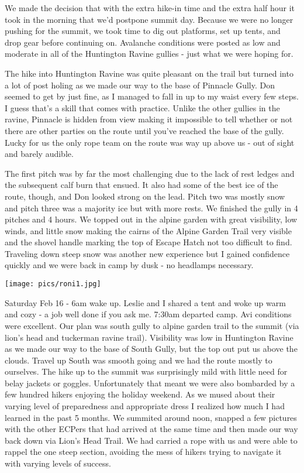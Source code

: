 \documentclass[10pt,a4paper]{article}
\newenvironment{Figure}
  {\par\medskip\noindent\minipage{\linewidth}}
  {\endminipage\par\medskip}
\begin{document}
\begin{multicols}{2}
We made the decision that with the extra hike-in time and the extra half hour it took in the morning that we'd postpone summit day. Because we were no longer pushing for the summit, we took time to dig out platforms, set up tents, and drop gear before continuing on. Avalanche conditions were posted as low and moderate in all of the Huntington Ravine gullies - just what we were hoping for. 


The hike into Huntington Ravine was quite pleasant on the trail but turned into a lot of post holing as we made our way to the base of Pinnacle Gully. Don seemed to get by just fine, as I managed to fall in up to my waist every few steps. I guess that's a skill that comes with practice. 
Unlike the other gullies in the ravine, Pinnacle is hidden from view making it impossible to tell whether or not there are other parties on the route until you've reached the base of the gully. Lucky for us the only rope team on the route was way up above us - out of sight and barely audible.


 The first pitch was by far the most challenging due to the lack of rest ledges and the subsequent calf burn that ensued. It also had some of the best ice of the route, though, and Don looked strong on the lead. Pitch two was mostly snow and pitch three was a majority ice but with more rests. We finished the gully in 4 pitches and 4 hours. We topped out in the alpine garden with great visibility, low winds, and little snow making the cairns of the Alpine Garden Trail very visible and the shovel handle marking the top of Escape Hatch not too difficult to find. 
Traveling down steep snow was another new experience but I gained confidence quickly and we were back in camp by dusk - no headlamps necessary. 

\begin{Figure}
 \centering
 \texttt{[image: pics/roni1.jpg]}
\end{Figure}

 
Saturday Feb 16 - 6am wake up. Leslie and I shared a tent and woke up warm and cozy - a job well done if you ask me. 7:30am departed camp. Avi conditions were excellent. Our plan was south gully to alpine garden trail to the summit (via lion's head and tuckerman ravine trail). Visibility was low in Huntington Ravine as we made our way to the base of South Gully, but the top out put us above the clouds. Travel up South was smooth going and we had the route mostly to ourselves. The hike up to the summit was surprisingly mild with little need for belay jackets or goggles. Unfortunately that meant we were also bombarded by a few hundred hikers enjoying the holiday weekend. As we mused about their varying level of preparedness and appropriate dress I realized how much I had learned in the past 5 months. We summited around noon, snapped a few pictures with the other ECPers that had arrived at the same time and then made our way back down via Lion's Head Trail. We had carried a rope with us and were able to rappel the one steep section, avoiding the mess of hikers trying to navigate it with varying levels of success. 


\end{multicols}
\end{document}
